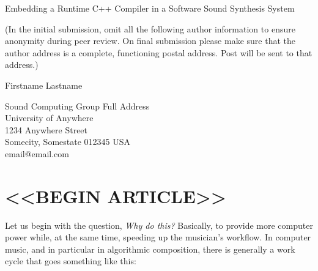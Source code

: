 \documentclass[letterpaper, 12pt]{article}
\begin{document}
{\cmjTitle Embedding a Runtime C++ Compiler in a Software Sound Synthesis System}
\vspace*{24pt}

(In the initial submission, omit all the following author information to ensure anonymity during peer review.
On final submission please make sure that the author address is a complete, functioning postal address.
Post will be sent to that address.)

{\cmjAuthor Firstname Lastname}	%
 
\begin{cmjAuthorAddress}
	Sound Computing Group Full Address\\
	University of Anywhere\\
	1234 Anywhere Street\\
	Somecity, Somestate 012345 USA\\		%
	email@email.com
\end{cmjAuthorAddress}


\begin{abstract}
	This article considers why musicians and researchers might want to use a C++ compiler embedded in a software synthesis (SWSS) system, and how such a compiler can be implemented and used, by presenting new opcodes for the Csound SWSS that embed the Clang/LLVM on-request compiler (ORC). C++ source code may be embedded in a regular Csound orchestra file, compiled by the \texttt{Clang\_compile} opcode, and invoked during performance by the \texttt{Clang\_invoke} opcode. Uses include writing new signal processing and synthesis code in C++ right in the SWSS, full-strength algorithmic composition right in the SWSS, calling into external dynamic link libraries right from the SWSS, creating native user interfaces for a piece right in the SWSS, and more. The technology and patterns presented here could be adapted for use in any SWSS that supports the C calling convention. 
\end{abstract}

\section{<<BEGIN ARTICLE>>}
Let us begin with the question, \textit{Why do this?} Basically, to provide more computer power while, at the same time, speeding up the musician's workflow. In computer music, and in particular in algorithmic composition, there is generally a work cycle that goes something like this:
\end{document}
